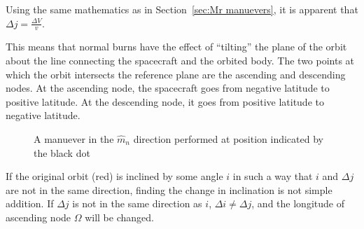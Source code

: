 \documentclass[../basicOrbitalDynamics.tex]{subfiles}
\begin{document}
Using the same mathematics as in Section~\ref{sec:Mr manuevers}, it is apparent that $\Delta j=\frac{\Delta V}{v}$.

This means that normal burns have the effect of ``tilting'' the plane of the orbit about the line connecting the spacecraft and the orbited body. The two points at which the orbit intersects the reference plane are the ascending and descending nodes. At the ascending node, the spacecraft goes from negative latitude to positive latitude. At the descending node, it goes from positive latitude to negative latitude.

\begin{figure}[H]
    \centering
    \def\ecc{0}
    \def\SMA{3}
    \def\incI{20}
    \def\dJ{20}


    \caption{A manuever in the $\hat{m}_n$ direction performed at position indicated by the black dot}\label{fig:Inclination Changes}
\end{figure}

If the original orbit (red) is inclined by some angle $i$ in such a way that $i$ and $\Delta j$ are not in the same direction, finding the change in inclination is not simple addition. If $\Delta j$ is not in the same direction as $i$, $\Delta i \ne \Delta j$, and the longitude of ascending node $\Omega$ will be changed.
\end{document}
